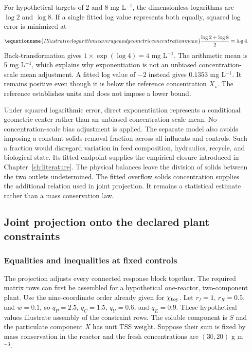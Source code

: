 For hypothetical targets of 2 and 8 mg L$^{-1}$, the dimensionless logarithms are $\log2$ and $\log8$. If a single fitted log value represents both equally, squared log error is minimized at
\begin{equation}
\equationname{Illustrative logarithmic average and geometric concentration mean}
\frac{\log2+\log8}{2}=\log4.
\end{equation}
Back-transformation gives $1\times\exp(\log4)=4$ mg L$^{-1}$. The arithmetic mean is 5 mg L$^{-1}$, which explains why exponentiation is not an unbiased concentration-scale mean adjustment. A fitted log value of $-2$ instead gives $0.1353$ mg L$^{-1}$. It remains positive even though it is below the reference concentration $X_\star$. The reference establishes units and does not impose a lower bound.

Under squared logarithmic error, direct exponentiation represents a conditional geometric center rather than an unbiased concentration-scale mean. No concentration-scale bias adjustment is applied. The separate model also avoids imposing a constant solids-removal fraction across all influents and controls. Such a fraction would disregard variation in feed composition, hydraulics, recycle, and biological state. Its fitted endpoint supplies the empirical closure introduced in Chapter~\ref{ch:literature}. The physical balances leave the division of solids between the two outlets undetermined. The fitted overflow solids concentration supplies the additional relation used in joint projection. It remains a statistical estimate rather than a mass conservation law.

\subsection{Joint projection onto the declared plant constraints}

\subsubsection{Equalities and inequalities at fixed controls}

The projection adjusts every connected response block together. The required matrix rows can first be assembled for a hypothetical one-reactor, two-component plant. Use the nine-coordinate order already given for $\chi_{\rm toy}$. Let $r_I=1$, $r_R=0.5$, and $w=0.1$, so $q_P=2.5$, $q_C=1.5$, $q_U=0.6$, and $q_E=0.9$. These hypothetical values illustrate assembly of the constraint rows. The soluble component is $S$ and the particulate component $X$ has unit TSS weight. Suppose their sum is fixed by mass conservation in the reactor and the fresh concentrations are $(30,20)$ g m$^{-3}$.

